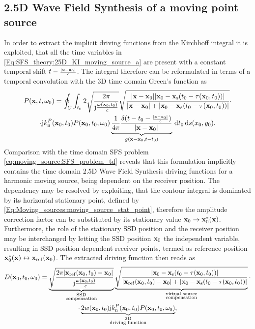 \subsection{2.5D Wave Field Synthesis of a moving point source}

In order to extract the implicit driving functions from the Kirchhoff integral it is exploited, that all the time variables in \eqref{Eq:SFS_theory:25D_KI_moving_source_a} are present with a constant temporal shift $t-{\scriptstyle \frac{|\mathbf{x}-\mathbf{x}_0|}{c} }$.
The integral therefore can be reformulated in terms of a temporal convolution with the 3D time domain Green's function as
\begin{multline}
P(\mathbf{x},t,\omega_0) =
\small
\oint_{C}  \int_{t_0} 2 
\sqrt{\frac{2\pi}{\mathrm{j}\frac{\omega(\mathbf{x}_0,t_0)}{c}}}
\sqrt{\frac{|\mathbf{x}-\mathbf{x}_0||\mathbf{x}_0 - \mathbf{x}_{\mathrm{s}}(t_0-\tau(\mathbf{x}_0,t_0))|}{|\mathbf{x}-\mathbf{x}_0|+|\mathbf{x}_0 - \mathbf{x}_{\mathrm{s}}(t_0-\tau(\mathbf{x}_0,t_0))|}} \cdot \\ \cdot
 \mathrm{j} k_{\mathrm{n}}^P(\mathbf{x}_0,t_0) P(\mathbf{x}_0,t_0,\omega_0)
\underbrace{\frac{1}{4\pi} \frac{ \delta(t-t_0- {\scriptstyle \frac{|\mathbf{x}-\mathbf{x}_0|}{c} }) }{|\mathbf{x}-\mathbf{x}_0|}}_{g(\mathbf{x}-\mathbf{x}_0,t-t_0)}
\, \mathrm{d} t_0 \, \mathrm{d} s(x_0, y_0).
\label{Eq:SFS_theory:25D_KI_moving_source_2}
\end{multline}
Comparison with the time domain SFS problem \eqref{eq:moving_source:SFS_problem_td} reveals that this formulation implicitly contains the time domain 2.5D Wave Field Synthesis driving functions for a harmonic moving source, being dependent on the receiver position.
The dependency may be resolved by exploiting, that the contour integral is dominated by its horizontal stationary point, defined by \eqref{Eq:Moving_sources:moving_source_stat_point}, therefore the amplitude correction factor can be substituted by its stationary value $\mathbf{x}_0 \rightarrow \mathbf{x}_0^*(\mathbf{x})$.
Furthermore, the role of the stationary SSD position and the receiver position may be interchanged by letting the SSD position $\mathbf{x}_0$ the independent variable, resulting in SSD position dependent receiver points, termed as reference position $\mathbf{x}_0^*(\mathbf{x}) \leftrightarrow \mathbf{x}_{\mathrm{ref}}(\mathbf{x}_0)$.
The extracted driving function then reads as
\begin{multline}
D(\mathbf{x}_0,t_0,\omega_0) =
\underbrace{ \sqrt{\frac{2\pi |\mathbf{x}_{\mathrm{ref}}(\mathbf{x}_0,t_0)-\mathbf{x}_0|}{\mathrm{j}\frac{\omega(\mathbf{x}_0,t_0)}{c}}}}_{{\substack{\text{SSD}\\\text{compensation}}}}
\underbrace{\sqrt{\frac{|\mathbf{x}_0 - \mathbf{x}_{\mathrm{s}}(t_0-\tau(\mathbf{x}_0,t_0))|}{|\mathbf{x}_{\mathrm{ref}}(\mathbf{x}_0,t_0)-\mathbf{x}_0|+|\mathbf{x}_0 - \mathbf{x}_{\mathrm{s}}(t_0-\tau(\mathbf{x}_0,t_0))|}}}_{{\substack{\text{virtual source}\\\text{compensation}}}} 
\cdot \\ \cdot
\underbrace{2 w(\mathbf{x}_0,t_0) \mathrm{j} k_{\mathrm{n}}^P(\mathbf{x}_0,t_0) P(\mathbf{x}_0,t_0,\omega_0)}_{\substack{\text{2D}\\\text{driving function}}},
\label{Eq:SFS_theory:25D_KI_moving_source}
\end{multline}
